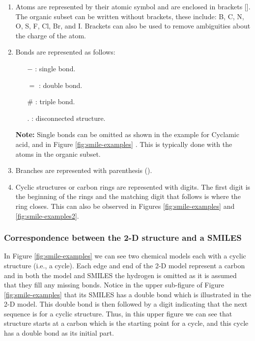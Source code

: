         \begin{enumerate}
            \item Atoms are represented by their atomic symbol and are enclosed in brackets []. The organic subset can be written without brackets, these include: B, C, N, O, S, F, Cl, Br, and I. Brackets can also be used to remove ambiguities about the charge of the atom. 
            \item Bonds are represented as follows: 
            \begin{itemize}
                \item[$-$] : single bond.
                \item[$=$] : double bond.
                \item[$\#$] : triple bond.
                \item[$.$] : disconnected structure.
            \end{itemize}
            \textbf{Note:} Single bonds can be omitted as shown in the example for  Cyclamic acid, and in Figure \ref{fig:smile-examples} .  This is typically done with the atoms in the organic subset.  %
            \item Branches are represented with parenthesis ().
            \item Cyclic structures or carbon rings are represented with digits. The first digit is the beginning of the rings and the matching digit that follows is where the ring closes. This can also be observed in Figures \ref{fig:smile-examples} and \ref{fig:smile-examples2}.
        \end{enumerate}
    \subsubsection{Correspondence between the 2-D structure and a SMILES}
    In Figure \ref{fig:smile-examples} we can see two chemical models each with a cyclic structure (i.e., a cycle). Each edge and end of the 2-D model represent a carbon and in both the model and SMILES the hydrogen is omitted as it is assumed that they fill any missing bonds. Notice in the upper sub-figure of Figure \ref{fig:smile-examples} that its SMILES has a double bond which is illustrated in the 2-D model. This double bond is then followed by a digit indicating that the next sequence is for a cyclic structure.  Thus, in this upper figure we can see that structure starts at a carbon which is the starting point for a  cycle, and this cycle has  a double bond as its initial part. 
    
